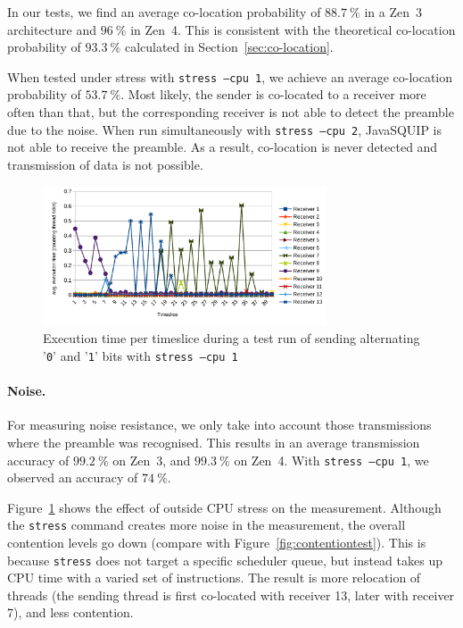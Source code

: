\documentclass[11pt,
  titlepage=false,
  parskip=half,      %
]{scrreprt}
\begin{document}
In our tests, we find an average co-location probability of $88.7~\%$ in a Zen~3 architecture and $96~\%$ in Zen~4.
This is consistent with the theoretical co-location probability of $93.3~\%$ calculated in Section~\ref{sec:co-location}.

When tested under stress with \texttt{stress --cpu 1}, we achieve an average co-location probability of $53.7~\%$.
Most likely, the sender is co-located to a receiver more often than that,
but the corresponding receiver is not able to detect the preamble due to the noise.
When run simultaneously with \texttt{stress --cpu 2}, JavaSQUIP is not able to receive the preamble.
As a result, co-location is never detected and transmission of data is not possible.

\begin{figure}
    \centering
    \includegraphics[width=0.75\textwidth]{figures/contentiontest_stress}

    \caption{Execution time per timeslice during a test run of sending alternating '\texttt{0}' and '\texttt{1}' bits with \texttt{stress --cpu 1}}
    \label{fig:contentiontest_stress}
\end{figure}

\paragraph{Noise.}
For measuring noise resistance, we only take into account those transmissions where the preamble was recognised.
This results in an average transmission accuracy of $99.2~\%$ on Zen~3, and $99.3~\%$ on Zen~4.
With \texttt{stress --cpu 1}, we observed an accuracy of $74~\%$.

Figure~\ref{fig:contentiontest_stress} shows the effect of outside CPU stress on the measurement.
Although the \texttt{stress} command creates more noise in the measurement, the overall contention levels go down (compare with Figure~\ref{fig:contentiontest}).
This is because \texttt{stress} does not target a specific scheduler queue, but instead takes up CPU time with a varied set of instructions.
The result is more relocation of threads (the sending thread is first co-located with receiver 13, later with receiver 7), and less contention.
\end{document}

